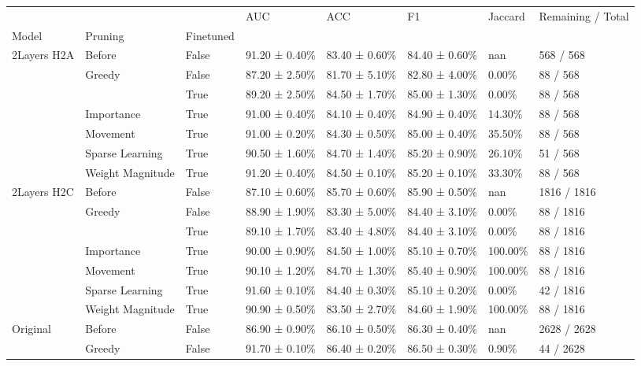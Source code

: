 \begin{tabular}{llllllll}
\toprule
 &  &  & AUC & ACC & F1 & Jaccard & Remaining / Total \\
Model & Pruning & Finetuned &  &  &  &  &  \\
\midrule
\multirow[t]{7}{*}{2Layers H2A} & Before & False & 91.20 ± 0.40\% & 83.40 ± 0.60\% & 84.40 ± 0.60\% & nan & 568 / 568 \\
\cline{2-8}
 & \multirow[t]{2}{*}{Greedy} & False & 87.20 ± 2.50\% & 81.70 ± 5.10\% & 82.80 ± 4.00\% & 0.00\% & 88 / 568 \\
 &  & True & 89.20 ± 2.50\% & 84.50 ± 1.70\% & 85.00 ± 1.30\% & 0.00\% & 88 / 568 \\
\cline{2-8}
 & Importance & True & 91.00 ± 0.40\% & 84.10 ± 0.40\% & 84.90 ± 0.40\% & 14.30\% & 88 / 568 \\
\cline{2-8}
 & Movement & True & 91.00 ± 0.20\% & 84.30 ± 0.50\% & 85.00 ± 0.40\% & 35.50\% & 88 / 568 \\
\cline{2-8}
 & Sparse Learning & True & 90.50 ± 1.60\% & 84.70 ± 1.40\% & 85.20 ± 0.90\% & 26.10\% & 51 / 568 \\
\cline{2-8}
 & Weight Magnitude & True & 91.20 ± 0.40\% & 84.50 ± 0.10\% & 85.20 ± 0.10\% & 33.30\% & 88 / 568 \\
\cline{1-8} \cline{2-8}
\multirow[t]{7}{*}{2Layers H2C} & Before & False & 87.10 ± 0.60\% & 85.70 ± 0.60\% & 85.90 ± 0.50\% & nan & 1816 / 1816 \\
\cline{2-8}
 & \multirow[t]{2}{*}{Greedy} & False & 88.90 ± 1.90\% & 83.30 ± 5.00\% & 84.40 ± 3.10\% & 0.00\% & 88 / 1816 \\
 &  & True & 89.10 ± 1.70\% & 83.40 ± 4.80\% & 84.40 ± 3.10\% & 0.00\% & 88 / 1816 \\
\cline{2-8}
 & Importance & True & 90.00 ± 0.90\% & 84.50 ± 1.00\% & 85.10 ± 0.70\% & 100.00\% & 88 / 1816 \\
\cline{2-8}
 & Movement & True & 90.10 ± 1.20\% & 84.70 ± 1.30\% & 85.40 ± 0.90\% & 100.00\% & 88 / 1816 \\
\cline{2-8}
 & Sparse Learning & True & 91.60 ± 0.10\% & 84.40 ± 0.30\% & 85.10 ± 0.20\% & 0.00\% & 42 / 1816 \\
\cline{2-8}
 & Weight Magnitude & True & 90.90 ± 0.50\% & 83.50 ± 2.70\% & 84.60 ± 1.90\% & 100.00\% & 88 / 1816 \\
\cline{1-8} \cline{2-8}
\multirow[t]{7}{*}{Original} & Before & False & 86.90 ± 0.90\% & 86.10 ± 0.50\% & 86.30 ± 0.40\% & nan & 2628 / 2628 \\
\cline{2-8}
 & \multirow[t]{2}{*}{Greedy} & False & 91.70 ± 0.10\% & 86.40 ± 0.20\% & 86.50 ± 0.30\% & 0.90\% & 44 / 2628 \\

\end{tabular}
